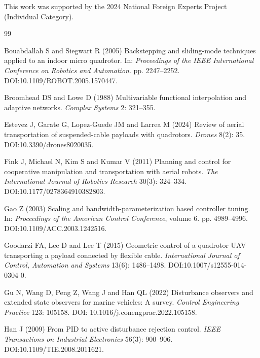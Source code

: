 \documentclass[Review,sageh,times]{sagej}
\begin{document}
\begin{funding}
{This work was supported by the 2024 National Foreign Experts Project (Individual Category).}
\end{funding}

\begin{thebibliography}{99}

Bouabdallah S and Siegwart R (2005) Backstepping and sliding-mode techniques applied to an
indoor micro quadrotor. In: \emph{Proceedings of the IEEE International Conference on Robotics
and Automation}. pp. 2247--2252. DOI:10.1109/ROBOT.2005.1570447.

Broomhead DS and Lowe D (1988) Multivariable functional interpolation and adaptive networks.
\emph{Complex Systems} 2: 321--355.

Estevez J, Garate G, Lopez-Guede JM and Larrea M (2024) Review of aerial transportation of
suspended-cable payloads with quadrotors. \emph{Drones} 8(2): 35. DOI:10.3390/drones8020035.

Fink J, Michael N, Kim S and Kumar V (2011) Planning and control for cooperative manipulation
and transportation with aerial robots. \emph{The International Journal of Robotics Research} 30(3):
324--334. DOI:10.1177/0278364910382803.

Gao Z (2003) Scaling and bandwidth-parameterization based controller tuning.
In: \emph{Proceedings of the American Control Conference}, volume 6. pp. 4989--4996.
DOI:10.1109/ACC.2003.1242516.

Goodarzi FA, Lee D and Lee T (2015) Geometric control of a quadrotor UAV transporting a payload
connected by flexible cable. \emph{International Journal of Control, Automation and Systems} 13(6):
1486--1498. DOI:10.1007/s12555-014-0304-0.

Gu N, Wang D, Peng Z, Wang J and Han QL (2022) Disturbance observers and extended state
observers for marine vehicles: A survey. \emph{Control Engineering Practice} 123: 105158. DOI:
10.1016/j.conengprac.2022.105158.

Han J (2009) From PID to active disturbance rejection control. \emph{IEEE Transactions on Industrial
Electronics} 56(3): 900--906. DOI:10.1109/TIE.2008.2011621.


\end{thebibliography}
\end{document}
